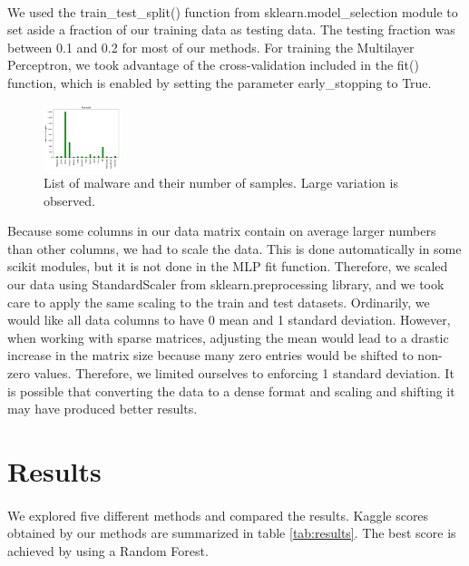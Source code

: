 \documentclass[11pt]{article}
\begin{document}
\paragraph{} We used the train\_test\_split() function from sklearn.model\_selection module to set aside a fraction of our training data as testing data. The testing fraction was between 0.1 and 0.2 for most of our methods. For training the Multilayer Perceptron, we took advantage of the cross-validation included in the fit() function, which is enabled by setting the parameter early\_stopping to True.\\
\begin{figure}
\centering
\includegraphics[width=0.2\textwidth]{Plots/Nsample.png}
\caption{List of malware and their number of samples. Large variation is observed.}
\label{fig:var}
\end{figure}
\noindent Because some columns in our data matrix contain on average larger numbers than other columns, we had to scale the data. This is done automatically in some scikit modules, but it is not done in the MLP fit function. Therefore, we scaled our data using StandardScaler from sklearn.preprocessing library, and we took care to apply the same scaling to the train and test datasets. Ordinarily, we would like all data columns to have 0 mean and 1 standard deviation. However, when working with sparse matrices, adjusting the mean would lead to a drastic increase in the matrix size because many zero entries would be shifted to non-zero values. Therefore, we limited ourselves to enforcing 1 standard deviation. It is possible that converting the data to a dense format and scaling and shifting it may have produced better results. \\



\section{Results}
\paragraph{} We explored five different methods and compared the results. Kaggle scores obtained by our methods are summarized in table \ref{tab:results}. The best score is achieved by using a Random Forest.\\
\end{document}
